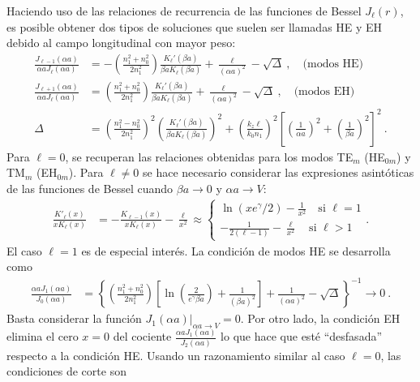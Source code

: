 Haciendo uso de las relaciones de recurrencia de las funciones de Bessel $J_\ell(r)$,  es posible obtener dos tipos de soluciones que suelen ser llamadas HE y EH debido al campo longitudinal con mayor peso:
\begin{align}
		\frac{J_{\ell-1}(\alpha a)}{\alpha a J_\ell(\alpha a)} &= -\left(\frac{n_1^2+n_0^2}{2n_1^2}\right) \frac{K_\ell'(\beta a)}{\beta a K_\ell(\beta a)}+\frac{\ell}{(\alpha a)^2}-\sqrt{\Delta} \ , \quad \text{(modos HE)}
		\label{eqn:HE}
	\\
		\frac{J_{\ell+1}(\alpha a)}{\alpha a J_\ell(\alpha a)} &= \left(\frac{n_1^2+n_0^2}{2n_1^2}\right) \frac{K_\ell'(\beta a)}{\beta a K_\ell(\beta a)}+\frac{\ell}{(\alpha a)^2}-\sqrt{\Delta} \ , \quad \text{(modos EH)}
		\label{eqn:EH}
		\\
		\Delta &= \left(\frac{n_1^2-n_0^2}{2n_1^2}\right)^2\left(\frac{K_\ell'(\beta a)}{\beta a K_\ell(\beta a)}\right)^2+ \left( \frac{ k_z \ell}{ k_0 n_1} \right)^2\left[ \left(\frac{1}{\alpha a}\right)^2 + \left(\frac{1}{\beta a}\right)^2 \right]^2 \ . \nonumber
\end{align}
Para $\ell = 0$, se recuperan las relaciones obtenidas para los modos  TE$_m$ (HE$_{0m}$) y TM$_m$ (EH$_{0m}$). Para $\ell \neq 0$ se hace necesario considerar las expresiones asintóticas de las funciones de Bessel cuando $\beta a \to 0$ y $\alpha a \to V$:
\begin{align*}
	\frac{K'_\ell (x)}{xK_\ell (x)} &= -\frac{K_{\ell-1} (x)}{xK_\ell (x)}-\frac{\ell}{x^2}\approx \left\{\begin{matrix}
	\ln(xe^\gamma/2)-\frac{1}{x^2} \quad\text{si }\ell = 1
	\\
	-\frac{
	1}{2(\ell-1)}-\frac{\ell}{x^2}\quad \text{si }\ell > 1
	\end{matrix}\right. .
\end{align*}
El caso $\ell=1$ es de especial interés. La condición de modos HE se desarrolla como
\begin{align*}
	\frac{\alpha a J_1(\alpha a)}{J_0(\alpha a)} &= \left\{\left(\frac{n_1^2+n_0^2}{2n_1^2}\right) \left[ \ln\left(\frac{2}{e^\gamma \beta a}\right)+\frac{1}{(\beta a)^2} \right]+\frac{1}{(\alpha a)^2}-\sqrt{\Delta}\right\}^{-1} \to 0 \ .
\end{align*}
Basta considerar la función $J_1(\alpha a)|_{\alpha a \to V} = 0$. Por otro lado, la condición EH elimina el cero $x=0$ del cociente $\frac{\alpha aJ_1(\alpha a)}{J_2(\alpha a)}$ lo que hace que esté ``desfasada'' respecto a la condición HE. Usando un razonamiento similar al caso $\ell =0$, las condiciones de corte son
